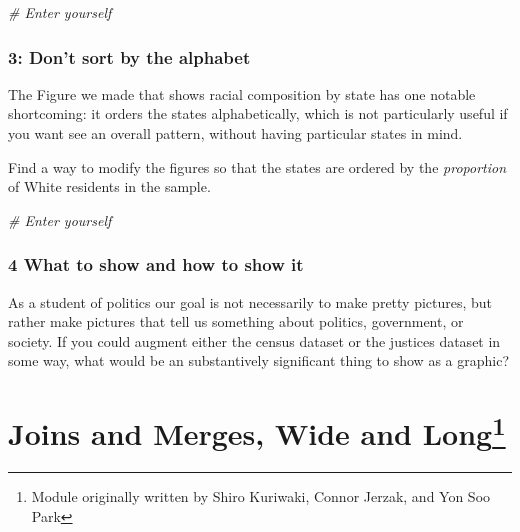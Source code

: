 \documentclass[
]{book}
\newenvironment{Shaded}{\begin{snugshade}}{\end{snugshade}}
\newcommand{\CommentTok}[1]{\textcolor[rgb]{0.56,0.35,0.01}{\textit{#1}}}
\theoremstyle{definition}
\theoremstyle{definition}
\theoremstyle{definition}
\theoremstyle{definition}
\theoremstyle{remark}
\begin{document}
\begin{Shaded}
\begin{Highlighting}[]
\CommentTok{# Enter yourself}
\end{Highlighting}
\end{Shaded}

\hypertarget{dont-sort-by-the-alphabet}{%
\subsection*{3: Don't sort by the alphabet}\label{dont-sort-by-the-alphabet}}

The Figure we made that shows racial composition by state has one notable shortcoming: it orders the states alphabetically, which is not particularly useful if you want see an overall pattern, without having particular states in mind.

Find a way to modify the figures so that the states are ordered by the \emph{proportion} of White residents in the sample.

\begin{Shaded}
\begin{Highlighting}[]
\CommentTok{# Enter yourself}
\end{Highlighting}
\end{Shaded}

\hypertarget{what-to-show-and-how-to-show-it}{%
\subsection*{4 What to show and how to show it}\label{what-to-show-and-how-to-show-it}}

As a student of politics our goal is not necessarily to make pretty pictures, but rather make pictures that tell us something about politics, government, or society. If you could augment either the census dataset or the justices dataset in some way, what would be an substantively significant thing to show as a graphic?

\hypertarget{dempeace}{%
\chapter[Joins and Merges, Wide and Long]{\texorpdfstring{Joins and Merges, Wide and Long\footnote{Module originally written by Shiro Kuriwaki, Connor Jerzak, and Yon Soo Park}}{Joins and Merges, Wide and Long}}\label{dempeace}}
\end{document}
